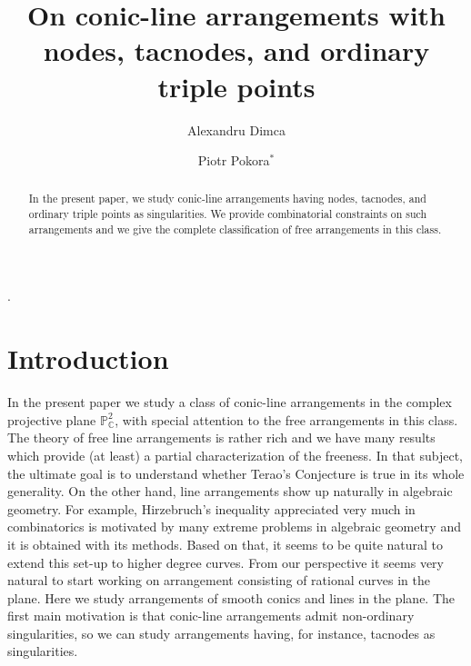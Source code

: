 \documentclass[12pt]{amsart}
\theoremstyle{plain}
\theoremstyle{definition}
\numberwithin{equation}{section}
\begin{document}
\title [On conic-line arrangements in the plane]
{On conic-line arrangements with nodes, tacnodes, and ordinary triple points}

\author[Alexandru Dimca]{Alexandru Dimca}
\address{Universit\'e C\^ ote d'Azur, CNRS, LJAD, France and Simion Stoilow Institute of Mathematics,
P.O. Box 1-764, RO-014700 Bucharest, Romania}


\author[Piotr Pokora]{Piotr Pokora$^{\ast}$}.
\address{Department of Mathematics,
Pedagogical University of Krakow,
Podchor\c a\.zych 2,
PL-30-084 Krak\'ow, Poland}





\begin{abstract} In the present paper, we study conic-line arrangements having nodes, tacnodes, and ordinary triple points as singularities. We provide combinatorial constraints on such arrangements and we give the complete classification of free arrangements in this class. 
\end{abstract}
 
\maketitle

\section{Introduction}
In the present paper we study  a class of conic-line arrangements in the complex projective plane $\mathbb{P}^{2}_{\mathbb{C}}$, with special attention to the free arrangements in this class. The theory of free line arrangements is rather rich and we have many results which provide (at least) a partial characterization of the freeness. In that subject, the ultimate goal is to understand whether Terao's Conjecture is true in its whole generality. On the other hand, line arrangements show up naturally in algebraic geometry. For example, Hirzebruch's inequality appreciated very much in combinatorics is motivated by many extreme problems in algebraic geometry and it is obtained with its methods. Based on that, it seems to be quite natural to extend this set-up to higher degree curves. From our perspective it seems very natural to start working on arrangement consisting of rational curves in the plane. Here we study arrangements of smooth conics and lines in the plane. The first main motivation is that conic-line arrangements admit non-ordinary singularities, so we can study arrangements having, for instance, tacnodes as singularities. 
\end{document}
